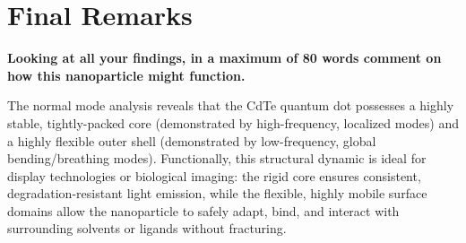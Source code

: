 \documentclass[11pt, a4paper]{article}
\begin{document}
\newpage

\section*{Final Remarks}

\textbf{Looking at all your findings, in a maximum of 80 words comment on how this nanoparticle might function.}
\vspace{0.5cm}

The normal mode analysis reveals that the CdTe quantum dot possesses a highly stable, tightly-packed core (demonstrated by high-frequency, localized modes) and a highly flexible outer shell (demonstrated by low-frequency, global bending/breathing modes). Functionally, this structural dynamic is ideal for display technologies or biological imaging: the rigid core ensures consistent, degradation-resistant light emission, while the flexible, highly mobile surface domains allow the nanoparticle to safely adapt, bind, and interact with surrounding solvents or ligands without fracturing.
\end{document}
